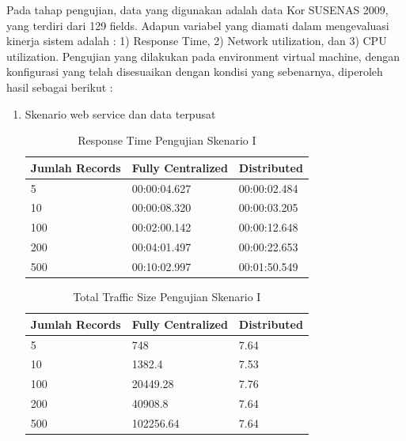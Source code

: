 Pada tahap pengujian, data yang digunakan adalah data Kor SUSENAS 2009, yang terdiri dari 129 fields. Adapun variabel yang diamati dalam mengevaluasi kinerja sistem adalah : 1) Response Time, 2) Network utilization, dan 3) CPU utilization. Pengujian yang dilakukan pada environment virtual machine, dengan konfigurasi yang telah disesuaikan dengan kondisi yang sebenarnya, diperoleh hasil sebagai berikut :
\begin{enumerate}
\item Skenario web service dan data terpusat

\begin{table}
\begin{minipage}{\linewidth}
\centering
\begin{tabular}{|l|l|l|}
\hline
\textbf{Jumlah Records} & \textbf{Fully Centralized} & \textbf{Distributed} \\ \hline
5           & 00:00:04.627            & 00:00:02.484                  \\ \hline
10           & 00:00:08.320            & 00:00:03.205                  \\ \hline
100           & 00:02:00.142         & 00:00:12.648                  \\ \hline
200           & 00:04:01.497             & 00:00:22.653                 \\ \hline
500           & 00:10:02.997             & 00:01:50.549                 \\ \hline
\end{tabular}
\caption{Response Time Pengujian Skenario I}
\label{table:testing-1-response-time}
\end{minipage}
\end{table}

\begin{table}
\begin{minipage}{\linewidth}
\centering
\begin{tabular}{|l|l|l|}
\hline
\textbf{Jumlah Records} & \textbf{Fully Centralized} & \textbf{Distributed} \\ \hline
5           & 748            & 7.64                  \\ \hline
10           & 1382.4            & 7.53                  \\ \hline
100           & 20449.28         & 7.76                  \\ \hline
200           & 40908.8             & 7.64                 \\ \hline
500           & 102256.64             & 7.64                 \\ \hline
\end{tabular}
\caption{Total Traffic Size Pengujian Skenario I}
\label{table:testing-1-traffic}
\end{minipage}
\end{table}


\end{enumerate}
